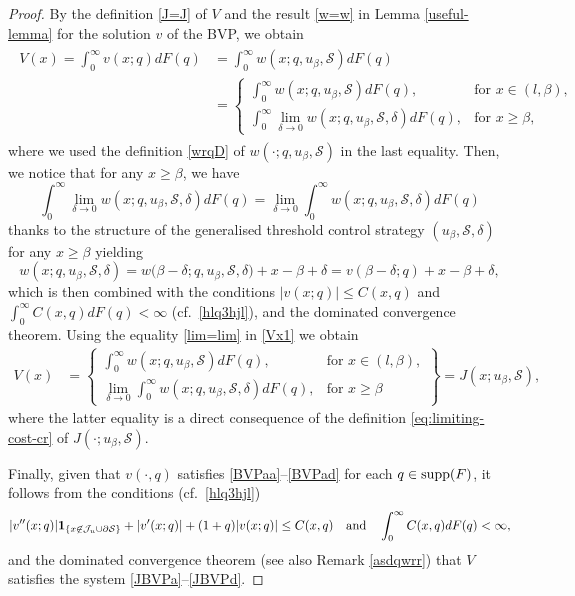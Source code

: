\documentclass[11pt]{article} %
\numberwithin{komcounter}{section}
\begin{document}
\begin{proof}
By the definition \eqref{J=J} of $V$ and the result \eqref{w=w} in Lemma \ref{useful-lemma} for the solution $v$ of the BVP, we obtain 
\begin{align} \label{Vx1}
\begin{split}
V(x) 
=\int_0^\infty v(x;q)dF(q)
&=\int_0^\infty w(x;q,u_\beta,\mathcal{S}) dF(q) \\
& = \begin{cases} 
\int_0^\infty w(x;q,u_\beta,\mathcal{S}) dF(q), & \text{for } x\in(l,\beta), \\
\int_0^\infty \lim_{\delta\to 0} w(x;q,u_\beta,\mathcal{S},\delta) dF(q), & \text{for } x \geq \beta,
\end{cases}
\end{split}
\end{align} 
where we used the definition \eqref{wrqD} of $w(\cdot;q,u_\beta,\mathcal{S})$ in the last equality. 
Then, we notice that for any $x\geq \beta$, we have  
\begin{equation} \label{lim=lim}
\int_0^\infty \lim_{\delta\to 0} w(x;q,u_\beta,\mathcal{S},\delta) dF(q) = 
\lim_{\delta\to 0} \int_0^\infty w(x;q,u_\beta,\mathcal{S},\delta) dF(q)
\end{equation}
thanks to the structure of the generalised threshold control strategy $(u_\beta,\mathcal{S},\delta)$ for any $x\geq \beta$ yielding  
$$
w(x;q,u_\beta,\mathcal{S},\delta) 
= w\big(\beta-\delta; q, u_\beta,\mathcal{S},\delta\big) + x - \beta + \delta 
= v(\beta-\delta;q) + x - \beta + \delta,
$$ 
which is then combined with the conditions $|v(x;q)| \leq C(x,q)$ and $\int_0^\infty C(x,q)dF(q)<\infty$ (cf.~\eqref{hlq3hjl}),
and the dominated convergence theorem. 
Using the equality \eqref{lim=lim} in \eqref{Vx1} we obtain  
\begin{align*}
V(x) 
&= \left. \begin{cases} 
\int_0^\infty w(x;q,u_\beta,\mathcal{S}) dF(q), & \text{for } x\in(l,\beta), \\
\lim_{\delta\to 0} \int_0^\infty w(x;q,u_\beta,\mathcal{S},\delta) dF(q), & \text{for } x \geq \beta
\end{cases} \right\}
= J(x;u_\beta, \mathcal{S}),
\end{align*} 
where the latter equality is a direct consequence of the definition \eqref{eq:limiting-cost-cr} of $J(\cdot; u_\beta, \mathcal{S})$.

Finally, given that $v(\cdot,q)$ satisfies \eqref{BVPaa}--\eqref{BVPad} for each $q\in  {\rm supp}(F)$, it follows from the conditions (cf.~\eqref{hlq3hjl})
\begin{align*}
|v''(x;q)| {\bf 1}_{\{x\not\in \mathcal{J}_u\cup \partial\mathcal{S}\}} +|v'(x;q)|+ (1+q)|v(x;q)| \leq C(x,q) 
\quad \text{and} \quad 
\int_0^\infty C(x,q)dF(q)<\infty,
\end{align*}
and the dominated convergence theorem (see also Remark \ref{asdqwrr}) that $V$ satisfies the system \eqref{JBVPa}--\eqref{JBVPd}.
\end{proof}
\end{document}
